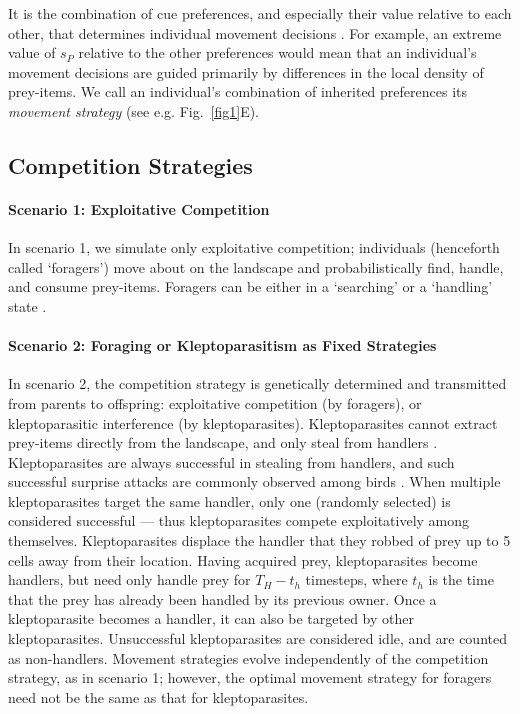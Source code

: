 \begin{refsection}[sorting=nyt]
It is the combination of cue preferences, and especially their value relative to each other, that determines individual movement decisions \citep[similar to relative selection coefficients,][]{fortin2005,avgar2016,white2018}. 
For example, an extreme value of $s_P$ relative to the other preferences would mean that an individual's movement decisions are guided primarily by differences in the local density of prey-items.
We call an individual's combination of inherited preferences its \textit{movement strategy} (see e.g. Fig.~\ref{fig1}E).

\subsection*{Competition Strategies}

\paragraph{Scenario 1: Exploitative Competition}

In scenario 1, we simulate only exploitative competition; individuals (henceforth called `foragers') move about on the landscape and probabilistically find, handle, and consume prey-items.
Foragers can be either in a `searching' or a `handling' state \citep{holmgren1995}.

\paragraph{Scenario 2: Foraging or Kleptoparasitism as Fixed Strategies}

In scenario 2, the competition strategy is genetically determined and transmitted from parents to offspring: exploitative competition (by foragers), or kleptoparasitic interference (by kleptoparasites).
Kleptoparasites cannot extract prey-items directly from the landscape, and only steal from handlers \citep[see][]{holmgren1995}.
Kleptoparasites are always successful in stealing from handlers, and such successful surprise attacks are commonly observed among birds \citep{brockmann1979}.
When multiple kleptoparasites target the same handler, only one (randomly selected) is considered successful --- thus kleptoparasites compete exploitatively among themselves.
Kleptoparasites displace the handler that they robbed of prey up to 5 cells away from their location.
Having acquired prey, kleptoparasites become handlers, but need only handle prey for $T_H - t_h$ timesteps, where $t_h$ is the time that the prey has already been handled by its previous owner.
Once a kleptoparasite becomes a handler, it can also be targeted by other kleptoparasites.
Unsuccessful kleptoparasites are considered idle, and are counted as non-handlers.
Movement strategies evolve independently of the competition strategy, as in scenario 1; however, the optimal movement strategy for foragers need not be the same as that for kleptoparasites.


\end{refsection}
